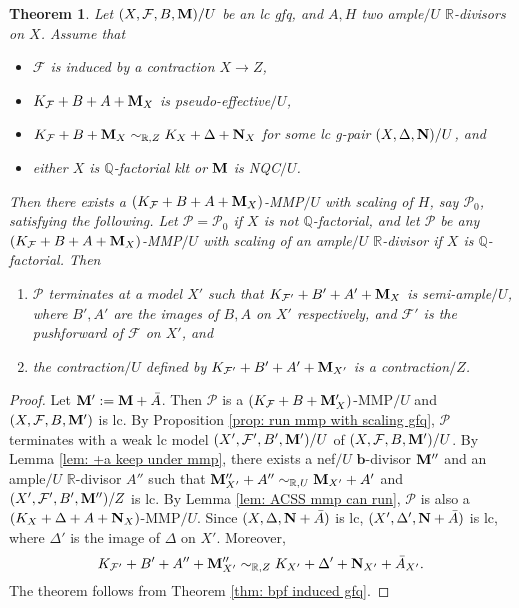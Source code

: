 \documentclass[11pt]{amsart}
\numberwithin{equation}{section}
\newcommand{\bb}{\bm{b}}
\newcommand{\Mm}{{\bf{M}}}
\newcommand{\Nn}{{\bf{N}}}
\newcommand{\Qq}{\mathbb{Q}}
\newcommand{\Rr}{\mathbb{R}}
\newcommand{\Ff}{\mathcal{F}}
\newtheorem{thm}{Theorem}[subsection]
\theoremstyle{definition}
\theoremstyle{definition}
\theoremstyle{definition}
\begin{document}
\begin{thm}\label{thm: gmm polarized gfq}
    Let $(X,\Ff,B,\Mm)/U$ be an lc gfq, and $A,H$ two ample$/U$ $\Rr$-divisors on $X$. Assume that
    \begin{itemize}
        \item $\Ff$ is induced by a contraction $X\rightarrow Z$,
        \item $K_{\Ff}+B+A+\Mm_X$ is pseudo-effective$/U$, 
        \item $K_{\Ff}+B+\Mm_X\sim_{\mathbb R,Z}K_X+\Delta+\Nn_X$ for some lc g-pair $(X,\Delta,\Nn)/U$, and
        \item either $X$ is $\Qq$-factorial klt or $\Mm$ is NQC$/U$.
    \end{itemize}
   Then there exists a $(K_{\Ff}+B+A+\Mm_X)$-MMP$/U$ with scaling of $H$, say $\mathcal{P}_0$, satisfying the following. Let $\mathcal{P}=\mathcal{P}_0$ if $X$ is not $\Qq$-factorial, and let $\mathcal{P}$ be any $(K_{\Ff}+B+A+\Mm_X)$-MMP$/U$  with scaling of an ample$/U$ $\Rr$-divisor if $X$ is $\Qq$-factorial.  Then 
   \begin{enumerate}
       \item  $\mathcal{P}$ terminates at a model $X'$ such that $K_{\Ff'}+B'+A'+\Mm_X$ is semi-ample$/U$, where $B',A'$ are the images of $B,A$ on $X'$ respectively, and $\Ff'$ is the pushforward of $\Ff$ on $X'$, and
       \item the contraction$/U$ defined by $K_{\Ff'}+B'+A'+\Mm_{X'}$ is a contraction$/Z$.
   \end{enumerate}
\end{thm}
\begin{proof}
Let $\Mm':=\Mm+\bar A$. Then $\mathcal{P}$ is a $(K_{\Ff}+B+\Mm'_X)$-MMP$/U$ and $(X,\Ff,B,\Mm')$ is lc. By Proposition \ref{prop: run mmp with scaling gfq}, $\mathcal{P}$ terminates with a weak lc model $(X',\Ff',B',\Mm')/U$ of $(X,\Ff,B,\Mm')/U$. By Lemma \ref{lem: +a keep under mmp}, there exists a nef$/U$ $\bb$-divisor $\Mm''$ and an ample$/U$ $\Rr$-divisor $A''$ such that $\Mm''_{X'}+A''\sim_{\mathbb R,U}\Mm_{X'}+A'$ and $(X',\Ff',B',\Mm'')/Z$ is lc. By Lemma \ref{lem: ACSS mmp can run}, $\mathcal{P}$ is also a $(K_X+\Delta+A+\Nn_X)$-MMP$/U$. Since $(X,\Delta,\Nn+\bar A)$ is lc, $(X',\Delta',\Nn+\bar A)$ is lc, where $\Delta'$ is the image of $\Delta$ on $X'$. Moreover,
$$K_{\Ff'}+B'+A''+\Mm''_{X'}\sim_{\mathbb R,Z}K_{X'}+\Delta'+\Nn_{X'}+\bar A_{X'}.$$
The theorem follows from Theorem \ref{thm: bpf induced gfq}.
\end{proof}
\end{document}
